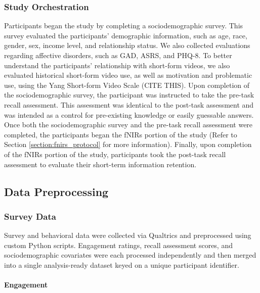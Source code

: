 \documentclass[10pt, twocolumn]{article}
\begin{document}
\subsubsection{Study Orchestration}
Participants began the study by completing a sociodemographic survey. This survey evaluated the participants' demographic information, such as age, race, gender, sex, income level, and relationship status. We also collected evaluations regarding affective disorders, such as GAD, ASRS, and PHQ-8. To better understand the participants' relationship with short-form videos, we also evaluated historical short-form video use, as well as motivation and problematic use, using the Yang Short-form Video Scale (CITE THIS). Upon completion of the sociodemographic survey, the participant was instructed to take the pre-task recall assessment. This assessment was identical to the post-task assessment and was intended as a control for pre-existing knowledge or easily guessable answers. Once both the sociodemographic survey and the pre-task recall assessment were completed, the participants began the fNIRs portion of the study (Refer to Section \ref{section:fnirs_protocol} for more information). Finally, upon completion of the fNIRs portion of the study, participants took the post-task recall assessment to evaluate their short-term information retention.


\subsection{Data Preprocessing}
\subsubsection{Survey Data}

Survey and behavioral data were collected via Qualtrics and preprocessed using custom Python scripts. Engagement ratings, recall assessment scores, and sociodemographic covariates were each processed independently and then merged into a single analysis-ready dataset keyed on a unique participant
identifier.

\paragraph{Engagement}
\end{document}
